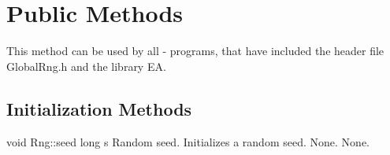 \vspace*{3mm}

\section{Public Methods}

\noindent
This method can be used by all \cpp - programs, that have included the
header file GlobalRng.h and the library EA.

\subsection{Initialization Methods}

\setNormalInstance
\printMethodWithOneParam
{void}
{Rng::seed}
{long}
{s}
{Random seed.}
{Initializes a random seed.}
{None.}
{None.}

